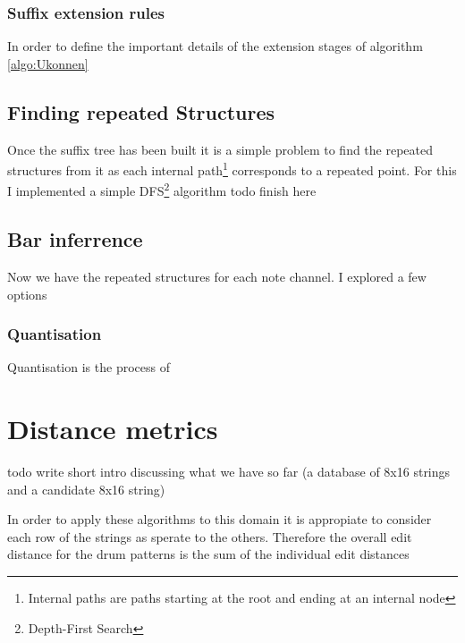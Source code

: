 \documentclass[12pt,twoside,notitlepage]{report}
\begin{document}
				
				
				\subsubsection{Suffix extension rules}
				In order to define the important details of the extension stages of algorithm \ref{algo:Ukonnen} 
			\subsection{Finding repeated Structures}
			Once the suffix tree has been built it is a simple problem to find the repeated structures from it as each internal path\footnote{Internal paths are paths starting at the root and ending at an internal node} corresponds to a repeated point. For this I implemented a simple DFS\footnote{Depth-First Search} algorithm
			todo finish here

			
		\subsection{Bar inferrence}
		Now we have the repeated structures for each note channel. I explored a few options 
			\subsubsection{Quantisation}
			Quantisation is the process of 
	\section{Distance metrics}
	todo write short intro discussing what we have so far (a database of 8x16 strings and a candidate 8x16 string)
	
	In order to apply these algorithms to this domain it is appropiate to consider each row of the strings as sperate to the others. Therefore the overall edit distance for the drum patterns is the sum of the individual edit distances
	
\end{document}
